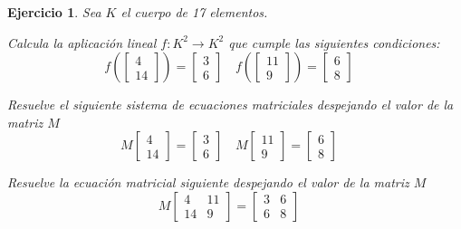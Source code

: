 \documentclass[12pt]{amsart}
\newtheorem{ejer}{Ejercicio}
\begin{document}
\begin{ejer} Sea $K$ el cuerpo de 17 elementos.
\newline
\noindent\begin{minipage}{\textwidth}
\begin{tcolorbox}[colback = green!20!white,title=Versión Aplicación]
Calcula la aplicaci\'on lineal $f:K^{2} \to K^{2}$ que cumple las siguientes condiciones: 
\[f\left(\left[\begin{array}{r}
4 \\
14
\end{array}\right]\right) = \left[\begin{array}{r}
3 \\
6
\end{array}\right] \quad f\left(\left[\begin{array}{r}
11 \\
9
\end{array}\right]\right) = \left[\begin{array}{r}
6 \\
8
\end{array}\right] \quad 
\]\end{tcolorbox}
\end{minipage} \newline
\noindent\begin{minipage}{\textwidth}
\begin{tcolorbox}[colback = blue!20!white,title=Versión Sistema Matricial]
Resuelve el siguiente sistema de ecuaciones matriciales despejando el valor de la matriz $M$
\[M \left[\begin{array}{r}
4 \\
14
\end{array}\right] = \left[\begin{array}{r}
3 \\
6
\end{array}\right] \quad M \left[\begin{array}{r}
11 \\
9
\end{array}\right] = \left[\begin{array}{r}
6 \\
8
\end{array}\right] \quad 
\]\end{tcolorbox}
\end{minipage} \newline
\noindent\begin{minipage}{\textwidth} 
\begin{tcolorbox}[colback = red!20!white,title=Versión Ecuación Matricial]
Resuelve la ecuación matricial siguiente despejando el valor de la matriz $M$
\[M \left[\begin{array}{rr}
4 & 11 \\
14 & 9
\end{array}\right] = \left[\begin{array}{rr}
3 & 6 \\
6 & 8
\end{array}\right] \quad 
\]
\end{tcolorbox}
\end{minipage}%
\end{ejer}
\end{document}
